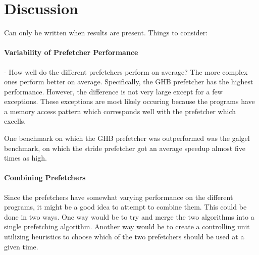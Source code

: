 
\section{Discussion} %
\label{sec:discussion}

Can only be written when results are present.
Things to consider:

\paragraph{Variability of Prefetcher Performance}
\label{par:varprefperf}

- How well do the different prefetchers perform on average?  The more
complex ones perform better on average. Specifically, the GHB
prefetcher has the highest performance. However, the difference is not
very large except for a few exceptions. These exceptions are most
likely occuring because the programs have a memory access pattern
which corresponds well with the prefetcher which excells.


One benchmark on which the GHB prefetcher was outperformed was the
galgel benchmark, on which the stride prefetcher got an average
speedup almost five times as high. 





\paragraph{Combining Prefetchers}
\label{par:prefcombo}
Since the prefetchers have somewhat varying performance on the
different programs, it might be a good idea to attempt to combine
them. This could be done in two ways. One way would be to try and
merge the two algorithms into a single prefetching algorithm. Another
way would be to create a controlling unit utilizing heuristics to
choose which of the two prefetchers should be used at a given time.

